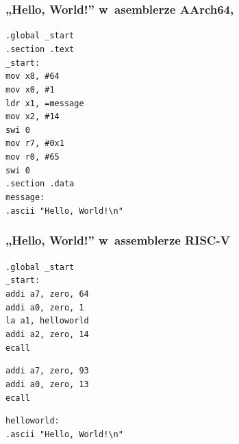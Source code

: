 \documentclass[10pt,t]{beamer}
\begin{document}
\begin{frame}
  \frametitle{„Hello, World!” w~asemblerze AArch64,
    \parencite{Low-Level-Learning-You-Can-Learn-AArch64-ETC-Ver-2020}}


  \texttt{.global \_start} \\
  \texttt{.section .text} \\



  \texttt{\_start:} \\[-0.2em]
  \hphantom{aaaaaaaa} \texttt{mov x8, \#64} \\
  \hphantom{aaaaaaaa} \texttt{mov x0, \#1} \\
  \hphantom{aaaaaaaa} \texttt{ldr x1, =message} \\
  \hphantom{aaaaaaaa} \texttt{mov x2, \#14} \\

  \hphantom{aaaaaaaa} \texttt{swi 0} \\

  \hphantom{aaaaaaaa} \texttt{mov r7, \#0x1} \\
  \hphantom{aaaaaaaa} \texttt{mov r0, \#65} \\

  \hphantom{aaaaaaaa} \texttt{swi 0} \\



  \texttt{.section .data} \\
  \texttt{message:} \\
  \hphantom{aaaaaaaa} \texttt{.ascii "Hello, World!\textbackslash n"}

\end{frame}





\begin{frame}
  \frametitle{„Hello, World!” w~assemblerze RISC-V
    \parencite{Low-Level-Learning-You-Can-Learn-RISC-V-ETC-Ver-2021}}


  \texttt{.global \_start} \\
  \texttt{\_start:} \\
  \hphantom{aaaa} \texttt{addi a7, zero, 64} \\
  \hphantom{aaaa} \texttt{addi a0, zero, 1} \\
  \hphantom{aaaa} \texttt{la a1, helloworld} \\
  \hphantom{aaaa} \texttt{addi a2, zero, 14} \\
  \hphantom{aaaa} \texttt{ecall}
  \vspace{0.8em}

  \hphantom{aaaa} \texttt{addi a7, zero, 93} \\
  \hphantom{aaaa} \texttt{addi a0, zero, 13} \\
  \hphantom{aaaa} \texttt{ecall}
  \vspace{0.8em}

  \texttt{helloworld:} \\
  \hphantom{aaaa} \texttt{.ascii "Hello, World!\textbackslash n"}

\end{frame}
\end{document}
